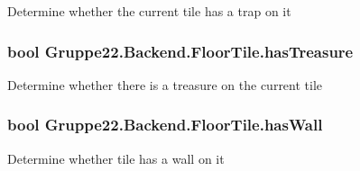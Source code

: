 Determine whether the current tile has a trap on it 

\hypertarget{class_gruppe22_1_1_backend_1_1_floor_tile_aa62f725bbf60ab19f680d56bef8d7848}{
\subsubsection[{has\-Treasure}]{\setlength{\rightskip}{0pt plus 5cm}bool Gruppe22.\-Backend.\-Floor\-Tile.\-has\-Treasure\hspace{0.3cm}{\ttfamily [get]}}}\label{class_gruppe22_1_1_backend_1_1_floor_tile_aa62f725bbf60ab19f680d56bef8d7848}


Determine whether there is a treasure on the current tile 

\hypertarget{class_gruppe22_1_1_backend_1_1_floor_tile_ad5e7dcc45afdb6acf6eca5510ae38049}{
\subsubsection[{has\-Wall}]{\setlength{\rightskip}{0pt plus 5cm}bool Gruppe22.\-Backend.\-Floor\-Tile.\-has\-Wall\hspace{0.3cm}{\ttfamily [get]}}}\label{class_gruppe22_1_1_backend_1_1_floor_tile_ad5e7dcc45afdb6acf6eca5510ae38049}


Determine whether tile has a wall on it 

